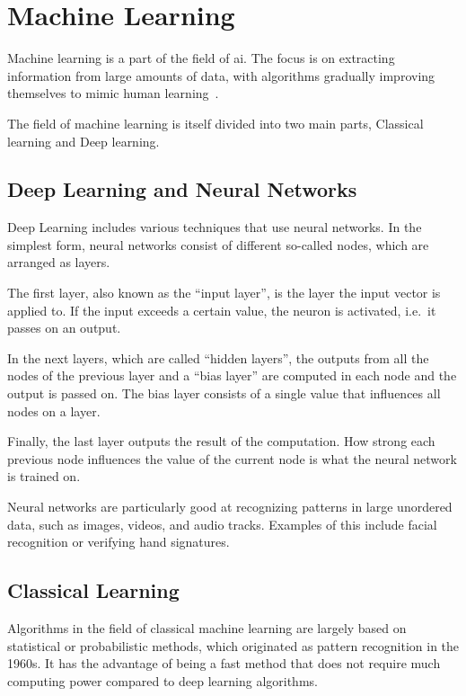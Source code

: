 \section{Machine Learning}\label{sec:machine_learning}
Machine learning is a part of the field of \ac{ai}. The focus is on extracting information from large amounts of data, with algorithms gradually improving themselves to mimic human learning~\cite{what-is-ml}.

The field of machine learning is itself divided into two main parts, Classical learning and Deep learning\cite{ml-visual-explanation}.


\subsection{Deep Learning and Neural Networks} %

Deep Learning includes various techniques that use neural networks. In the simplest form, neural networks consist of different so-called nodes, which are arranged as layers\cite{neuralNet}.

The first layer, also known as the \enquote{input layer}, is the layer the input vector is applied to. If the input exceeds a certain value, the neuron is activated, i.e.\ it passes on an output.

In the next layers, which are called \enquote{hidden layers}, the outputs from all the nodes of the previous layer and a \enquote{bias layer} are computed in each node and the output is passed on. The bias layer consists of a single value that influences all nodes on a layer.

Finally, the last layer outputs the result of the computation. How strong each previous node influences the value of the current node is what the neural network is trained on.

Neural networks are particularly good at recognizing patterns in large unordered data, such as images, videos, and audio tracks. Examples of this include facial recognition or verifying hand signatures\cite{neuralNet-applications}.



\subsection{Classical Learning} %
Algorithms in the field of classical machine learning are largely based on statistical or probabilistic methods, which originated as pattern recognition in the 1960s. It has the advantage of being a fast method that does not require much computing power compared to deep learning algorithms\cite{classical-ml}.

